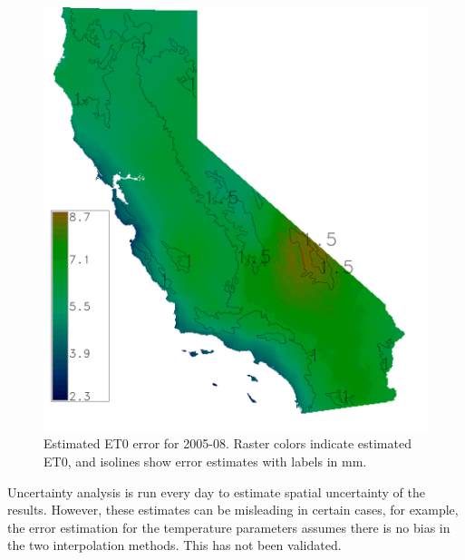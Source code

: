 \documentclass[reviewcopy]{elsart}
\begin{document}
\begin{figure}
  \centering
  \includegraphics[width=.5\textwidth]{figs/errors-2005-08.png}
  \caption{Estimated \ac{ET0} error for 2005-08.  Raster colors indicate estimated \ac{ET0}, and isolines show error estimates with labels in \unit{mm}.}
  \label{fig:error-map}
\end{figure}

Uncertainty analysis is run every day to estimate spatial uncertainty
of the results.  However, these estimates can be misleading in
certain cases, for example, the error estimation for the temperature
parameters assumes there is no bias in the two interpolation methods.
This has not been validated.


\end{document}
